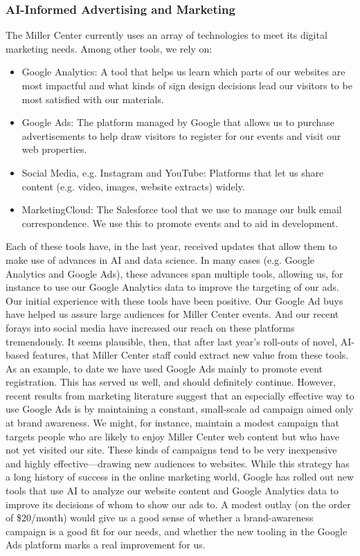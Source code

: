\documentclass[12pt, oneside]{article}   	%
\begin{document}
\subsubsection{AI-Informed Advertising and Marketing}\label{section.applications.easy.marketing}
The Miller Center currently uses an array of technologies to meet its digital marketing needs.  Among other tools, we rely on:
\begin{itemize}
\item Google Analytics: A tool that helps us learn which parts of our websites are most impactful and what kinds of sign design decisions lead our visitors to be most satisfied with our materials.
\item Google Ads: The platform managed by Google that allows us to purchase advertisements to help draw visitors to register for our events and visit our web properties.
\item Social Media, e.g. Instagram and YouTube: Platforms that let us share content (e.g. video, images, website extracts) widely.
\item MarketingCloud: The Salesforce tool that we use to manage our bulk email correspondence.  We use this to promote events and to aid in development.
\end{itemize}
Each of these tools have, in the last year, received updates that allow them to make use of advances in AI and data science.  In many cases (e.g. Google Analytics and Google Ads), these advances span multiple tools, allowing us, for instance to use our Google Analytics data to improve the targeting of our ads.  
Our initial experience with these tools have been positive.  Our Google Ad buys have helped us assure large audiences for Miller Center events.  And our recent forays into social media have increased our reach on these platforms tremendously.  It seems plausible, then, that after last year’s roll-outs of novel, AI-based features, that Miller Center staff could extract new value from these tools.
As an example, to date we have used Google Ads mainly to promote event registration.  This has served us well, and should definitely continue.  However, recent results from marketing literature suggest that an especially effective way to use Google Ads is by maintaining a constant, small-scale ad campaign aimed only at brand awareness.  We might, for instance, maintain a modest campaign that targets people who are likely to enjoy Miller Center web content but who have not yet visited our site.  These kinds of campaigns tend to be very inexpensive and highly effective—drawing new audiences to websites.  While this strategy has a long history of success in the online marketing world, Google has rolled out new tools that use AI to analyze our website content and Google Analytics data to improve its decisions of whom to show our ads to.   A modest outlay (on the order of \$20/month) would give us a good sense of whether a brand-awareness campaign is a good fit for our needs, and whether the new tooling in the Google Ads platform marks a real improvement for us.
\end{document}
